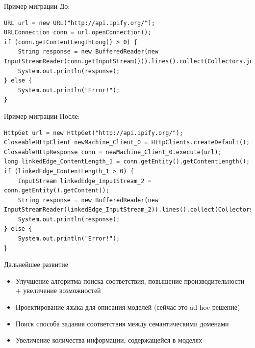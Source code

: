 \documentclass[12pt]{beamer}
\begin{document}
\begin{frame}[fragile]{Пример миграции}
До:
\begin{lstlisting}
URL url = new URL("http://api.ipify.org/");
URLConnection conn = url.openConnection();
if (conn.getContentLengthLong() > 0) {
    String response = new BufferedReader(new InputStreamReader(conn.getInputStream())).lines().collect(Collectors.joining("\n"));
    System.out.println(response);
} else {
    System.out.println("Error!");
}
\end{lstlisting}
\end{frame}

\begin{frame}[fragile]{Пример миграции}
После:
\begin{lstlisting}[basicstyle=\ttfamily\scriptsize]
HttpGet url = new HttpGet("http://api.ipify.org/");
CloseableHttpClient newMachine_Client_0 = HttpClients.createDefault();
CloseableHttpResponse conn = newMachine_Client_0.execute(url);
long linkedEdge_ContentLength_1 = conn.getEntity().getContentLength();
if (linkedEdge_ContentLength_1 > 0) {
    InputStream linkedEdge_InputStream_2 = conn.getEntity().getContent();
    String response = new BufferedReader(new InputStreamReader(linkedEdge_InputStream_2)).lines().collect(Collectors.joining("\n"));
    System.out.println(response);
} else {
    System.out.println("Error!");
}
\end{lstlisting}
\end{frame}

\begin{frame}[fragile]{Дальнейшее развитие}
	\begin{mybox}[]
		\begin{itemize}
			\item Улучшение алгоритма поиска соответствия, повышение производительности + увеличение возможностей
			\item Проектирование языка для описания моделей (сейчас это ad-hoc решение)
			\item Поиск способа задания соответствия между семантическими доменами
			\item Увеличение количества информации, содержащейся в моделях
		\end{itemize}
	\end{mybox}
\end{frame}
\end{document}
